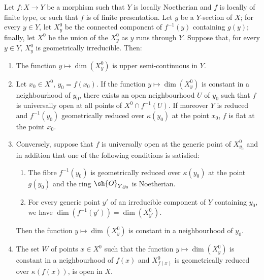 \begin{proposition}[15.6.6]
\label{IV.15.6.6}
Let $f:X\to Y$ be a morphism such that $Y$ is locally Noetherian and $f$ is locally of finite type, or such that $f$ is of finite presentation.
Let $g$ be a $Y$-section of $X$; for every $y\in Y$, let $X_y^0$ be the connected component of $f^{-1}(y)$ containing $g(y)$; finally, let $X^0$ be the union of the $X_y^0$ as $y$ runs through $Y$.
Suppose that, for every $y\in Y$, $X_y^0$ is geometrically irreducible.
Then:
\begin{enumerate}[label=(\roman*)]
  \item The function $y\mapsto\dim(X_y^0)$ is upper semi-continuous in $Y$.
  \item Let $x_0\in X^0$, $y_0=f(x_0)$.
If the function $y\mapsto\dim(X_y^0)$ is constant in a neighbourhood of $y_0$, there exists an open neighbourhood $U$ of $y_0$ such that $f$ is universally open at all points of $X^0\cap f^{-1}(U)$.
If moreover $Y$ is reduced and $f^{-1}(y_0)$ geometrically reduced over $\kappa(y_0)$ at the point $x_0$, $f$ is flat at the point $x_0$.
  \item Conversely, suppose that $f$ is universally open at the generic point of $X_{y_0}^0$ and in addition that one of the following conditions is satisfied:
  \begin{enumerate}
    \item[$\alpha$)] The fibre $f^{-1}(y_0)$ is geometrically reduced over $\kappa(y_0)$ at the point $g(y_0)$ and the ring $\sh{O}_{Y,y_0}$ is Noetherian.
    \item[$\beta$)] For every generic point $y'$ of an irreducible component of $Y$ containing $y_0$, we have $\dim(f^{-1}(y'))=\dim(X_{y'}^0)$.
  \end{enumerate}
Then the function $y\mapsto\dim(X_y^0)$ is constant in a neighbourhood of $y_0$.
  \item The set $W$ of points $x\in X^0$ such that the function $y\mapsto\dim(X_y^0)$ is constant in a neighbourhood of $f(x)$ and $X_{f(x)}^0$ is geometrically reduced over $\kappa(f(x))$, is open in $X$.
\end{enumerate}
\end{proposition}

